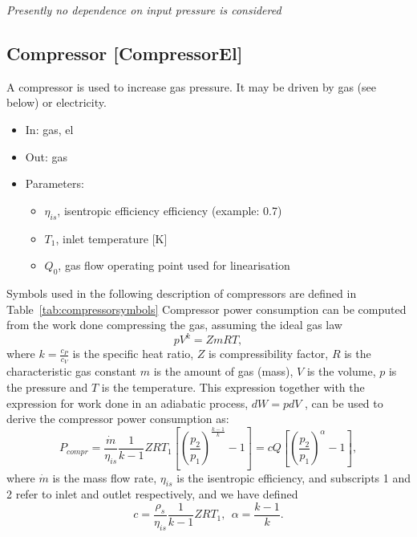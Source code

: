 \documentclass[12pt]{article}
\begin{document}
\noindent 
\textit{Presently no dependence on input pressure is considered}



\subsection{Compressor [CompressorEl]}
A compressor is used to increase gas pressure. It may be driven by gas (see below) or electricity.


\begin{itemize}
\item In: gas, el
\item Out: gas
\item Parameters:
\begin{itemize}[noitemsep,topsep=0pt]
	\item $\eta_{is}$,  isentropic efficiency efficiency (example: 0.7)
	\item $T_1$, inlet temperature [K]
	\item $Q_0$, gas flow operating point used for linearisation
\end{itemize}
\end{itemize}






\medskip\noindent
Symbols used in the following description of compressors are defined in Table~\ref{tab:compressorsymbols}
Compressor power consumption can be computed from the work done compressing the gas, assuming the ideal gas law 
\begin{equation}
 	 pV^{k}=ZmRT, 
\end{equation}
where  \( k=\frac{c_{P}}{c_{V}} \)  is the specific heat ratio,  \( Z \)  is compressibility factor,  \( R \)  is the characteristic gas constant  \( m \)  is the amount of gas (mass),  \( V \)  is the volume,  \( p \)  is the pressure and  \( T \)  is the temperature. This expression together with the expression for work done in an adiabatic process,  \( dW=pdV \) , can be used to derive the compressor power consumption as:
\begin{equation}
	P_{compr}=\frac{\dot{m}}{ \eta _{is}}\frac{1}{k-1}ZRT_{1} \left[  \left( \frac{p_{2}}{p_{1}} \right) ^{\frac{k-1}{k}}-1 \right] 
		=c Q \left[  \left( \frac{p_{2}}{p_{1}} \right) ^{ \alpha }-1 \right] , 
\end{equation} 
where  \( \dot{m} \)  is the mass flow rate,  \(  \eta _{is} \)  is the isentropic efficiency, and subscripts 1 and 2 refer to inlet and outlet respectively, and we have defined
\begin{equation}
	c=\frac{ \rho _{s}}{ \eta _{is}}\frac{1}{k-1}ZRT_{1},~~ \alpha =\frac{k-1}{k}. 
\end{equation}
\end{document}

